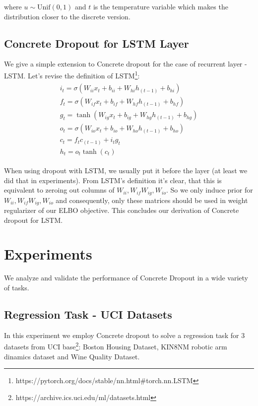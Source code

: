 \documentclass{article}
\begin{document}
where $u\sim \text{Unif}(0,1)$ and $t$ is the temperature variable which makes the distribution closer to the discrete version. 

\subsection{Concrete Dropout for LSTM Layer}

We give a simple extension to Concrete dropout for the case of recurrent layer - LSTM. Let's revise the definition of LSTM\footnote{https://pytorch.org/docs/stable/nn.html#torch.nn.LSTM}:
\[
\begin{split}\begin{array}{ll}
i_t = \sigma(W_{ii} x_t + b_{ii} + W_{hi} h_{(t-1)} + b_{hi}) \\
f_t = \sigma(W_{if} x_t + b_{if} + W_{hf} h_{(t-1)} + b_{hf}) \\
g_t = \tanh(W_{ig} x_t + b_{ig} + W_{hg} h_{(t-1)} + b_{hg}) \\
o_t = \sigma(W_{io} x_t + b_{io} + W_{ho} h_{(t-1)} + b_{ho}) \\
c_t = f_t c_{(t-1)} + i_t g_t \\
h_t = o_t \tanh(c_t)
\end{array}\end{split}
\]

When using dropout with LSTM, we usually put it before the layer (at least we did that in experiments). From LSTM's definition it's clear, that this is equivalent to zeroing out columns of $W_{ii}, W_{if} W_{ig}, W_{io}$. So we only induce prior for $W_{ii}, W_{if} W_{ig}, W_{io}$ and consequently, only these matrices should be used in weight regularizer of our ELBO objective. This concludes our derivation of Concrete dropout for LSTM.


\section{Experiments}
\label{sec:experiments}

We analyze and validate the performance of Concrete Dropout in a wide variety of tasks. 

\subsection{Regression Task - UCI Datasets}

In this experiment we employ Concrete dropout to solve a regression task for 3 datasets from UCI base\footnote{https://archive.ics.uci.edu/ml/datasets.html}: Boston Housing Dataset, KIN8NM robotic arm dinamics dataset and Wine Quality Dataset.
\end{document}

